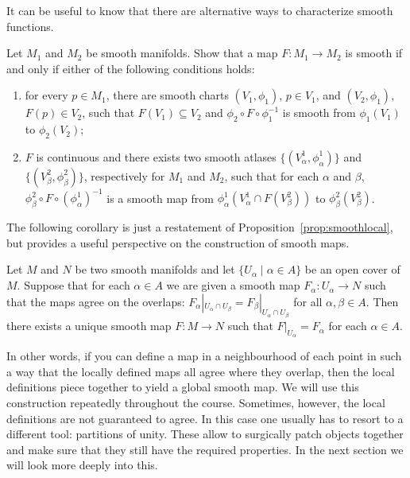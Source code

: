 It can be useful to know that there are alternative ways to characterize smooth functions.
\begin{exercise}\label{prop:eq-def-smooth}
  Let $M_1$ and $M_2$ be smooth manifolds.
  Show that a map $F:M_1\to M_2$ is smooth if and only if either of the following conditions holds:
  \begin{enumerate}
    \item for every $p\in M_1$, there are smooth charts $(V_1,\phi_1)$, $p\in V_1$, and $(V_2,\phi_1)$, $F(p) \in V_2$, such that $F(V_1) \subseteq V_2$ and $\phi_2 \circ F \circ \phi_1^{-1}$ is smooth from $\phi_1(V_1)$ to $\phi_2(V_2)$;
    \item $F$ is continuous and there exists two smooth atlases $\{(V^1_\alpha, \phi^1_\alpha)\}$ and $\{(V^2_\beta, \phi^2_\beta)\}$, respectively for $M_1$ and $M_2$, such that for each $\alpha$ and $\beta$, $\phi^2_\beta \circ F \circ (\phi^1_\alpha)^{-1}$ is a smooth map from $\phi^1_\alpha(V^1_\alpha \cap F(V_\beta^2))$ to $\phi^2_\beta(V^2_\beta)$.
  \end{enumerate}
\end{exercise}

The following corollary is just a restatement of Proposition~\ref{prop:smoothlocal}, but provides a useful perspective on the construction of smooth maps.

\begin{proposition}
  Let $M$ and $N$ be two smooth manifolds and let $\{U_\alpha\mid\alpha\in A\}$ be an open cover of $M$.
  Suppose that for each $\alpha\in A$ we are given a smooth map $F_
    \alpha:U_\alpha\to N$ such that the maps agree on the overlaps: $F_\alpha|_{U_\alpha\cap U_\beta} = F_\beta|_{U_\alpha\cap U_\beta}$ for all $\alpha,\beta\in A$.
  Then there exists a unique smooth map $F:M\to N$ such that $F|_{U_\alpha} = F_\alpha$ for each $\alpha\in A$.
\end{proposition}

In other words, if you can define a map in a neighbourhood of each point in such a way that the locally defined maps all agree where they overlap, then the local definitions piece together to yield a global smooth map.
We will use this construction repeatedly throughout the course.
Sometimes, however, the local definitions are not guaranteed to agree. In this case one usually has to resort to a different tool: partitions of unity.
These allow to surgically patch objects together and make sure that they still have the required properties.
In the next section we will look more deeply into this.

